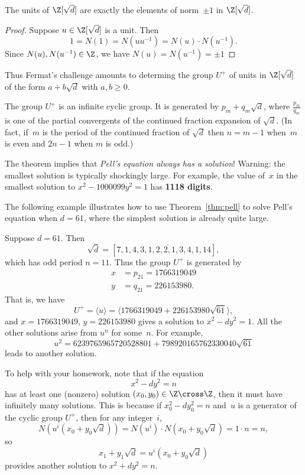 \documentclass[11pt]{report}
\begin{document}
\begin{proposition}
  The units of $\Z[\sqrt{d}]$ are exactly the elements of
  norm~$\pm 1$ in $\Z[\sqrt{d}]$.
\end{proposition}
\begin{proof}
  Suppose $u\in\Z[\sqrt{d}]$ is a unit.  Then
  $$
    1 = N(1) = N(u u^{-1}) = N(u)\cdot N(u^{-1}).
  $$
  Since $N(u), N(u^{-1})\in\Z$, we have $N(u) = N(u^{-1}) = \pm 1$
\end{proof}

Thus Fermat's challenge amounts to determing the group $U^+$ of
units in $\Z[\sqrt{d}]$ of the form $a+b\sqrt{d}$ with $a, b \geq 0$.
\begin{theorem}\label{thm:pell}
  The group $U^+$ is an infinite cyclic group.
  It is generated by $p_m+ q_m\sqrt{d}$, where
  $\frac{p_m}{q_m}$ is one of the partial convergents of the
  continued fraction expansion of $\sqrt{d}$.
  (In fact, if~$m$ is the period of the continued fraction of $\sqrt{d}$ then
  $n=m-1$ when~$m$ is even and $2n-1$ when $m$ is odd.)
\end{theorem}

The theorem implies that {\em Pell's equation always has a solution}!
Warning: the smallest solution is typically shockingly large.
For example, the value of~$x$ in the smallest solution to $x^2 -
  1000099y^2 = 1$ has {\bf 1118 digits}.

The following example illustrates how to use Theorem~\ref{thm:pell} to
solve Pell's equation when $d=61$, where the simplest solution is
already quite large.
\begin{example}
  Suppose $d=61$.  Then
  $$\sqrt{d} = [7, \overline{1, 4, 3, 1, 2, 2, 1, 3, 4, 1, 14}],$$
  which has odd period $n=11$. Thus the group $U^+$ is generated by
  \begin{align*}
    x & = p_{21} = 1766319049  \\
    y & = q_{21} =  226153980.
  \end{align*}
  That is, we have
  $$U^+ = \langle u \rangle = \langle 1766319049 + 226153980\sqrt{61}\rangle,$$
  and $x = 1766319049$, $y=226153980$ gives a solution to
  $x^2 - d y^2 = 1$.  All the other solutions arise from $u^n$ for
  some~$n$.  For example,
  $$u^2 = 6239765965720528801 + 798920165762330040\sqrt{61}$$
  leads to another solution.
\end{example}

\begin{remark}
  To help with your homework, note that if the equation
  $$
    x^2 - dy^2 = n
  $$
  has at least one (nonzero) solution $(x_0, y_0)\in\Z\cross\Z$, then it
  must have infinitely many solutions.  This is because if
  $x_0^2 - dy_0^2 =n$ and~$u$ is a generator of the
  cyclic group $U^+$, then for any integer~$i$,
  $$
    N(u^i(x_0+ y_0\sqrt{d})) = N(u^i)\cdot N(x_0+y_0\sqrt{d}) = 1\cdot n = n,
  $$
  so
  $$
    x_1 + y_1\sqrt{d} = u^i(x_0 + y_0\sqrt{d})
  $$
  provides another solution to $x^2 + d y^2 = n$.
\end{remark}
\end{document}
